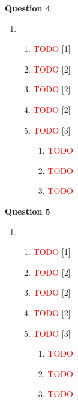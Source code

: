\noindent
\textbf{Question 4}
\begin{enumerate}[label=(\roman*)]

    \item 
        \begin{enumerate}[label=(\alph*)]
            \item \textcolor{red}{TODO} \hfill[1]
            \item \textcolor{red}{TODO} \hfill[2]
            \item \textcolor{red}{TODO} \hfill[2]
            \item \textcolor{red}{TODO} \hfill[2]
            \item \textcolor{red}{TODO} \hfill[3]
                \begin{enumerate}[label=(\roman*)]
                \item \textcolor{red}{TODO}
                \item \textcolor{red}{TODO}
                \item \textcolor{red}{TODO}
                \end{enumerate}
        \end{enumerate}

\end{enumerate}

\noindent
\textbf{Question 5}
\begin{enumerate}[label=(\roman*)]

    \item 
        \begin{enumerate}[label=(\alph*)]
            \item \textcolor{red}{TODO} \hfill[1]
            \item \textcolor{red}{TODO} \hfill[2]
            \item \textcolor{red}{TODO} \hfill[2]
            \item \textcolor{red}{TODO} \hfill[2]
            \item \textcolor{red}{TODO} \hfill[3]
                \begin{enumerate}[label=(\roman*)]
                \item \textcolor{red}{TODO}
                \item \textcolor{red}{TODO}
                \item \textcolor{red}{TODO}
                \end{enumerate}
        \end{enumerate}

\end{enumerate}
